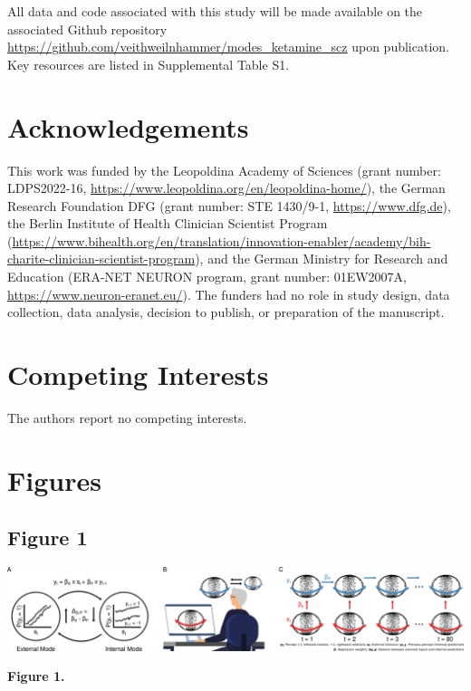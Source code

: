 \documentclass[
]{article}
\begin{document}
All data and code associated with this study will be made available on
the associated Github repository
\url{https://github.com/veithweilnhammer/modes_ketamine_scz} upon
publication. Key resources are listed in Supplemental Table S1.

\section{Acknowledgements}\label{acknowledgements}

This work was funded by the Leopoldina Academy of Sciences (grant
number: LDPS2022-16,
\url{https://www.leopoldina.org/en/leopoldina-home/}), the German
Research Foundation DFG (grant number: STE 1430/9-1,
\url{https://www.dfg.de}), the Berlin Institute of Health Clinician
Scientist Program
(\url{https://www.bihealth.org/en/translation/innovation-enabler/academy/bih-charite-clinician-scientist-program}),
and the German Ministry for Research and Education (ERA-NET NEURON
program, grant number: 01EW2007A, \url{https://www.neuron-eranet.eu/}).
The funders had no role in study design, data collection, data analysis,
decision to publish, or preparation of the manuscript.

\section{Competing Interests}\label{competing-interests}

The authors report no competing interests.

\newpage

\section{Figures}\label{figures}

\subsection{Figure 1}\label{figure-1}

\includegraphics{./Material/Figure_1.png}

\textbf{Figure 1.}
\end{document}
